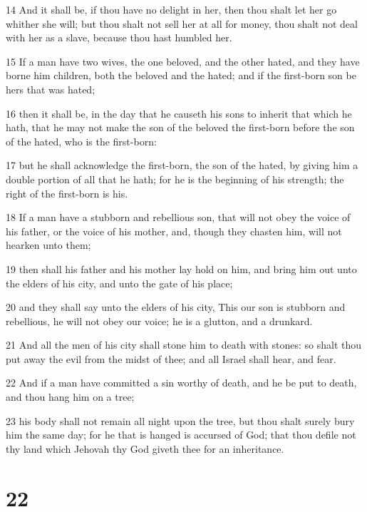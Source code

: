 \par 14 And it shall be, if thou have no delight in her, then thou shalt let her go whither she will; but thou shalt not sell her at all for money, thou shalt not deal with her as a slave, because thou hast humbled her.
\par 15 If a man have two wives, the one beloved, and the other hated, and they have borne him children, both the beloved and the hated; and if the first-born son be hers that was hated;
\par 16 then it shall be, in the day that he causeth his sons to inherit that which he hath, that he may not make the son of the beloved the first-born before the son of the hated, who is the first-born:
\par 17 but he shall acknowledge the first-born, the son of the hated, by giving him a double portion of all that he hath; for he is the beginning of his strength; the right of the first-born is his.
\par 18 If a man have a stubborn and rebellious son, that will not obey the voice of his father, or the voice of his mother, and, though they chasten him, will not hearken unto them;
\par 19 then shall his father and his mother lay hold on him, and bring him out unto the elders of his city, and unto the gate of his place;
\par 20 and they shall say unto the elders of his city, This our son is stubborn and rebellious, he will not obey our voice; he is a glutton, and a drunkard.
\par 21 And all the men of his city shall stone him to death with stones: so shalt thou put away the evil from the midst of thee; and all Israel shall hear, and fear.
\par 22 And if a man have committed a sin worthy of death, and he be put to death, and thou hang him on a tree;
\par 23 his body shall not remain all night upon the tree, but thou shalt surely bury him the same day; for he that is hanged is accursed of God; that thou defile not thy land which Jehovah thy God giveth thee for an inheritance.

\chapter{22}


